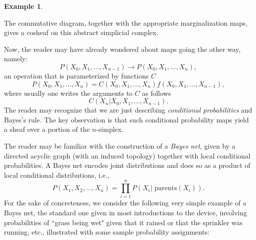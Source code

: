\documentclass[a4paper]{book}
\theoremstyle{definition}
\newtheorem{example}{Example}[section]
\theoremstyle{definition}
\theoremstyle{definition}
\theoremstyle{theorem}
\theoremstyle{definition}
\begin{document}
\begin{example}
\begin{center}
\end{center}
The commutative diagram, together with the appropriate marginalization maps, gives a cosheaf on this abstract simplicial complex.\par 
Now, the reader may have already wondered about maps going the other way, namely: 
\begin{equation}
P(X_0,X_1,\dots, X_{n-1}) \rightarrow P(X_0,X_1,\dots,X_n),
\end{equation}
an operation that is parameterized by functions $C$
\begin{equation}
P(X_0, X_1,\dots, X_n) = C(X_0,X_1,\dots,X_n) f(X_0,X_1,\dots,X_{n-1}),
\end{equation}
where usually one writes the arguments to $C$ as follows 
\begin{equation}
C(X_n \vert X_0, X_1, \dots, X_{n-1}).
\end{equation}
The reader may recognize that we are just describing \textit{conditional probabilities} and Bayes's rule. The key observation is that such conditional probability maps yield a sheaf over a portion of the $n$-simplex.\par 
The reader may be familiar with the construction of a \textit{Bayes net}, given by a directed acyclic graph (with an induced topology) together with local conditional probabilities. A Bayes net encodes joint distributions and does so as a product of local conditional distributions, i.e., 
\begin{equation}
P(X_1, X_2, \dots, X_n) = \prod_{i=1}^{n} P(X_i \lvert \text{ parents} (X_i) ).
\end{equation} 
For the sake of concreteness, we consider the following very simple example of a Bayes net, the standard one given in most introductions to the device, involving probabilities of ``grass being wet" given that it rained or that the sprinkler was running, etc., illustrated with some sample probability assignments: 
\begin{center} 

\end{center}
\end{example}
\end{document}
